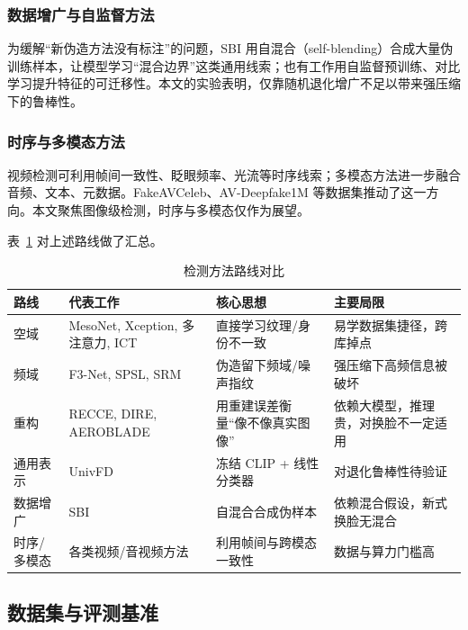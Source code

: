 \subsubsection{数据增广与自监督方法}

为缓解“新伪造方法没有标注”的问题，SBI\cite{shiohara2022sbi} 用自混合（self-blending）合成大量伪训练样本，让模型学习“混合边界”这类通用线索；也有工作用自监督预训练、对比学习提升特征的可迁移性。本文的实验表明，仅靠随机退化增广不足以带来强压缩下的鲁棒性。

\subsubsection{时序与多模态方法}

视频检测可利用帧间一致性、眨眼频率、光流等时序线索；多模态方法进一步融合音频、文本、元数据。FakeAVCeleb、AV-Deepfake1M 等数据集推动了这一方向。本文聚焦图像级检测，时序与多模态仅作为展望。

表~\ref{tab:methods} 对上述路线做了汇总。

\begin{table}[H]
\centering
\caption{检测方法路线对比}
\label{tab:methods}
\small
\begin{tabular}{p{2.0cm}p{4.0cm}p{4.3cm}p{3.4cm}}
\toprule
路线 & 代表工作 & 核心思想 & 主要局限 \\
\midrule
空域 & MesoNet, Xception, 多注意力, ICT & 直接学习纹理/身份不一致 & 易学数据集捷径，跨库掉点 \\
频域 & F3-Net, SPSL, SRM & 伪造留下频域/噪声指纹 & 强压缩下高频信息被破坏 \\
重构 & RECCE, DIRE, AEROBLADE & 用重建误差衡量“像不像真实图像” & 依赖大模型，推理贵，对换脸不一定适用 \\
通用表示 & UnivFD & 冻结 CLIP + 线性分类器 & 对退化鲁棒性待验证 \\
数据增广 & SBI & 自混合合成伪样本 & 依赖混合假设，新式换脸无混合 \\
时序/多模态 & 各类视频/音视频方法 & 利用帧间与跨模态一致性 & 数据与算力门槛高 \\
\bottomrule
\end{tabular}
\end{table}

\subsection{数据集与评测基准}

